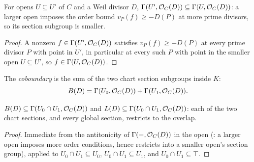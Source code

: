 \begin{lemma}
  \label{lem:adelic_sectionOfDivisor_antitone_open}
  \leanok
  For opens \(U \subseteq U'\) of \(C\) and a Weil divisor \(D\),
  \(\Gamma(U', \mathcal{O}_{C}(D)) \subseteq \Gamma(U, \mathcal{O}_{C}(D))\): a
  larger open imposes the order bound \(v_P(f) \ge -D(P)\) at more
  prime divisors, so its section subgroup is smaller.
\end{lemma}
\begin{proof}
  \leanok
  A nonzero \(f \in \Gamma(U', \mathcal{O}_{C}(D))\) satisfies
  \(v_P(f) \ge -D(P)\) at every prime divisor \(P\) with point in
  \(U'\), in particular at every such \(P\) with point in the smaller
  open \(U \subseteq U'\), so \(f \in \Gamma(U, \mathcal{O}_{C}(D))\).
\end{proof}

\begin{definition}
  \label{def:adelic_coboundary}
  \leanok
  The \emph{coboundary} is the sum of the two chart section subgroups
  inside \(K\):
  \[
    B(D)=\Gamma(U_0,\mathcal{O}_{C}(D))+\Gamma(U_1,\mathcal{O}_{C}(D)).
  \]
\end{definition}

\begin{lemma}
  \label{lem:adelic_coboundary_le_overlap}
  \leanok
  \(B(D) \subseteq \Gamma(U_0 \cap U_1, \mathcal{O}_{C}(D))\) and
  \(L(D) \subseteq \Gamma(U_0 \cap U_1, \mathcal{O}_{C}(D))\): each of the two
  chart sections, and every global section, restricts to the overlap.
\end{lemma}
\begin{proof}
  \leanok
  Immediate from the antitonicity of \(\Gamma(-, \mathcal{O}_{C}(D))\) in the
  open (: a larger open
  imposes more order conditions, hence restricts into a smaller open's
  section group), applied to \(U_0 \cap U_1 \subseteq U_0\), \(U_0 \cap
  U_1 \subseteq U_1\), and \(U_0 \cap U_1 \subseteq \top\).
\end{proof}

